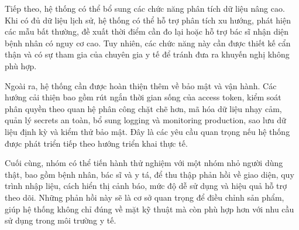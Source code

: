 \par Tiếp theo, hệ thống có thể bổ sung các chức năng phân tích dữ liệu nâng cao. Khi có đủ dữ liệu lịch sử, hệ thống có thể hỗ trợ phân tích xu hướng, phát hiện các mẫu bất thường, đề xuất thời điểm cần đo lại hoặc hỗ trợ bác sĩ nhận diện bệnh nhân có nguy cơ cao. Tuy nhiên, các chức năng này cần được thiết kế cẩn thận và có sự tham gia của chuyên gia y tế để tránh đưa ra khuyến nghị không phù hợp.

\par Ngoài ra, hệ thống cần được hoàn thiện thêm về bảo mật và vận hành. Các hướng cải thiện bao gồm rút ngắn thời gian sống của access token, kiểm soát phân quyền theo quan hệ phân công chặt chẽ hơn, mã hóa dữ liệu nhạy cảm, quản lý secrets an toàn, bổ sung logging và monitoring production, sao lưu dữ liệu định kỳ và kiểm thử bảo mật. Đây là các yêu cầu quan trọng nếu hệ thống được phát triển tiếp theo hướng triển khai thực tế.

\par Cuối cùng, nhóm có thể tiến hành thử nghiệm với một nhóm nhỏ người dùng thật, bao gồm bệnh nhân, bác sĩ và y tá, để thu thập phản hồi về giao diện, quy trình nhập liệu, cách hiển thị cảnh báo, mức độ dễ sử dụng và hiệu quả hỗ trợ theo dõi. Những phản hồi này sẽ là cơ sở quan trọng để điều chỉnh sản phẩm, giúp hệ thống không chỉ đúng về mặt kỹ thuật mà còn phù hợp hơn với nhu cầu sử dụng trong môi trường y tế.